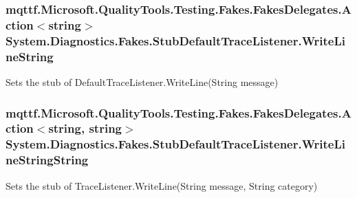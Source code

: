 \hypertarget{class_system_1_1_diagnostics_1_1_fakes_1_1_stub_default_trace_listener_a78e7fcef4ed92c2405dd26c84dd8a755}{
\subsubsection[{Write\-Line\-String}]{\setlength{\rightskip}{0pt plus 5cm}mqttf.\-Microsoft.\-Quality\-Tools.\-Testing.\-Fakes.\-Fakes\-Delegates.\-Action$<$string$>$ System.\-Diagnostics.\-Fakes.\-Stub\-Default\-Trace\-Listener.\-Write\-Line\-String}}\label{class_system_1_1_diagnostics_1_1_fakes_1_1_stub_default_trace_listener_a78e7fcef4ed92c2405dd26c84dd8a755}


Sets the stub of Default\-Trace\-Listener.\-Write\-Line(\-String message)

\hypertarget{class_system_1_1_diagnostics_1_1_fakes_1_1_stub_default_trace_listener_a8e32a8d7f13631c19b04db5881338c00}{
\subsubsection[{Write\-Line\-String\-String}]{\setlength{\rightskip}{0pt plus 5cm}mqttf.\-Microsoft.\-Quality\-Tools.\-Testing.\-Fakes.\-Fakes\-Delegates.\-Action$<$string, string$>$ System.\-Diagnostics.\-Fakes.\-Stub\-Default\-Trace\-Listener.\-Write\-Line\-String\-String}}\label{class_system_1_1_diagnostics_1_1_fakes_1_1_stub_default_trace_listener_a8e32a8d7f13631c19b04db5881338c00}


Sets the stub of Trace\-Listener.\-Write\-Line(\-String message, String category)

